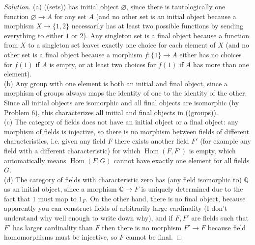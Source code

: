 \documentclass[10pt]{article}
\providecommand{\QQ}{\mathbb Q}
\newenvironment{soln}{\begin{proof}[Solution]}{\end{proof}}
\providecommand{\Hom}{\operatorname{Hom}}
\newcommand{\doubleparen}[1]{(\!(#1)\!)}
\begin{document}
\begin{soln}
    (a) \doubleparen{sets} has initial object $\varnothing$,
    since there is tautologically one function $\varnothing\to A$
    for any set $A$ (and no other set is an initial object
    because a morphism $X\to \{1,2\}$ necessarily has
    at least two possible functions by sending everything
    to either $1$ or $2$). Any singleton set is a final object
    because a function from $X$ to a singleton set
    leaves exactly one choice for each element of $X$
    (and no other set is a final object because
    a morphism $f\colon\{1\}\to A$ either has no choices for $f(1)$ if $A$ is empty,
    or at least two choices for $f(1)$ if $A$ has more than one element).
    \\

    (b) Any group with one element is both an initial and final object,
    since a morphism of groups always maps the identity of one
    to the identity of the other. Since all initial objects are isomorphic
    and all final objects are isomorphic (by Problem 6),
    this characterizes all initial and final objects in \doubleparen{groups}.
    \\

    (c) The category of fields does not have an initial object
    or a final object: any morphism of fields is injective,
    so there is no morphism between fields of different characteristics,
    i.e. given any field $F$ there exists another field $F'$
    (for example any field with a different characteristic)
    for which $\Hom(F,F')$ is empty, which automatically means
    $\Hom(F,G)$ cannot have exactly one element for all fields $G$.
    \\

    (d) The category of fields with characteristic zero has
    (any field isomorphic to) $\QQ$ as an initial object,
    since a morphism $\QQ\to F$ is uniquely determined due to the fact
    that $1$ must map to $1_F$.
    On the other hand, there is no final object,
    because apparently you can construct fields of arbitrarily large cardinality
    (I don't understand why well enough to write down why),
    and if $F,F'$ are fields such that
    $F'$ has larger cardinality than $F$ then there is no morphism $F'\to F$
    because field homomorphisms must be injective,
    so $F$ cannot be final.
\end{soln}
\end{document}
